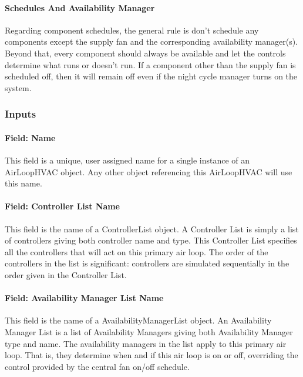 \paragraph{Schedules And Availability Manager}
Regarding component schedules, the general rule is don't schedule any components except the supply fan and the corresponding availability manager(s). Beyond that, every component should always be available and let the controls determine what runs or doesn't run. If a component other than the supply fan is scheduled off, then it will remain off even if the night cycle manager turns on the system.

\subsubsection{Inputs}\label{inputs-002}

\paragraph{Field: Name}

This field is a unique, user assigned name for a single instance of an AirLoopHVAC object. Any other object referencing this AirLoopHVAC will use this name.

\paragraph{Field: Controller List Name}\label{field-controller-list-name}

This field is the name of a ControllerList object. A Controller List is simply a list of controllers giving both controller name and type. This Controller List specifies all the controllers that will act on this primary air loop. The order of the controllers in the list is significant: controllers are simulated sequentially in the order given in the Controller List.

\paragraph{Field: Availability Manager List Name}\label{field-availability-manager-list-name}

This field is the name of a AvailabilityManagerList object. An Availability Manager List is a list of Availability Managers giving both Availability Manager type and name. The availability managers in the list apply to this primary air loop. That is, they determine when and if this air loop is on or off, overriding the control provided by the central fan on/off schedule.

